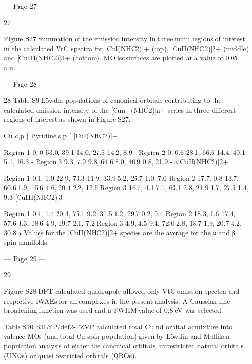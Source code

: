 --- Page 27 ---
 
27 
 
 
Figure S27 Summation of the emission intensity in three main regions of interest in the calculated VtC spectra 
for [CuI(NHC2)]+ (top), [CuII(NHC2)]2+ (middle) and [CuIII(NHC2)]3+ (bottom). MO isosurfaces are plotted at a value 
of 0.05 a.u. 
 
 
 
 
 
 


--- Page 28 ---
 
28 
Table S9 Löwdin populations of canonical orbitals contributing to the calculated emission intensity of the 
[Cun+(NHC2)]n+ series in three different regions of interest as shown in Figure S27. 
 
Cu d,p [%
Pyridine s,p [%
[CuI(NHC2)]+ 
 
 
 
 
 
Region 1 
0, 0 
53.0, 39.1 
34.0, 27.5 
14.2, 8.9 
- 
Region 2 
0, 0.6 
28.1, 66.6 
14.4, 40.1 
5.1, 16.3 
- 
Region 3 
9.3, 7.9 
9.8, 64.6 
8.0, 40.9 
0.8, 21.9 
- 
a[CuII(NHC2)]2+ 
 
 
 
 
 
Region 1 
0.1, 1.0 
22.9, 73.3 
11.9, 33.9 
5.2, 26.7 
1.0, 7.6 
Region 2 
17.7, 0.8 
13.7, 60.6 
1.9, 15.6 
4.6, 20.4 
2.2, 12.5 
Region 3 
16.7, 4.1 
7.1, 63.1 
2.8, 21.9 
1.7, 27.5 
1.4, 9.3 
[CuIII(NHC2)]3+ 
 
 
 
 
 
Region 1 
0.4, 1.4 
20.4, 75.1 
9.2, 31.5 
6.2, 29.7 
0.2, 0.4 
Region 2 
18.3, 0.6 
17.4, 57.6 
3.3, 18.6 
4.9, 19.7 
2.1, 7.2 
Region 3 
4.9, 4.5 
9.4, 72.0 
2.8, 18.7 
1.9, 20.7 
4.2, 30.8 
a Values for the [CuII(NHC2)]2+ species are the average for the α and β spin manifolds. 
 
 


--- Page 29 ---
 
29 
 
Figure S28 DFT calculated quadrupole allowed only VtC emission spectra and respective IWAEs for all 
complexes in the present analysis. A Gaussian line broadening function was used and a FWHM value of 0.8 eV 
was selected.  
 
Table S10 B3LYP/def2-TZVP calculated total Cu nd orbital admixture into valence MOs (and total Cu spin 
population) given by Löwdin and Mulliken population analysis of either the canonical orbitals, unrestricted natural 
orbitals (UNOs) or quasi restricted orbitals (QROs).  
 
